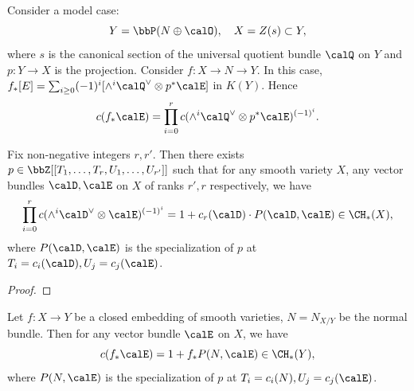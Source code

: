   Consider a model case:
  \[ Y = \bbP(N \oplus \calO), \quad X = Z(s) \subset Y, \]
  where $s$ is the canonical section of the universal quotient bundle $\calQ$ on $Y$ and $p: Y \to X$ is the projection.
  Consider $f: X \to N \to Y$.
  In this case, $f_*[E] = \sum_{i \geq 0} (-1)^i [\wedge^i \calQ^\vee \otimes p^* \calE]$ in $K(Y)$.
  Hence 
  \[ c(f_* \calE) = \prod_{i =0}^r c(\wedge^i \calQ^\vee \otimes p^* \calE)^{(-1)^i}. \]

  \begin{lemma}
    Fix non-negative integers $r, r'$.
    Then there exists $p \in \bbZ[[T_1, \ldots, T_r, U_1, \ldots, U_{r'}]]$ such that 
    for any smooth variety $X$, any vector bundles $\calD, \calE$ on $X$ of ranks $r', r$ respectively, 
    we have
    \[ \prod_{i=0}^r c(\wedge^i \calD^\vee \otimes \calE)^{(-1)^i} = 1 + c_r(\calD) \cdot P(\calD, \calE) \in \CH_*(X), \]
    where $P(\calD, \calE)$ is the specialization of $p$ at $T_i = c_i(\calD), U_j = c_j(\calE)$.
  \end{lemma}
  \begin{proof}
    
    \Yang{}
  \end{proof}

  \begin{theorem}
    Let $f: X \to Y$ be a closed embedding of smooth varieties, $N = N_{X/Y}$ be the normal bundle.
    Then for any vector bundle $\calE$ on $X$, we have
    \[ c(f_* \calE) = 1 + f_* P(N, \calE) \in \CH_*(Y), \]
    where $P(N, \calE)$ is the specialization of $p$ at $T_i = c_i(N), U_j = c_j(\calE)$.
    \Yang{}
  \end{theorem}